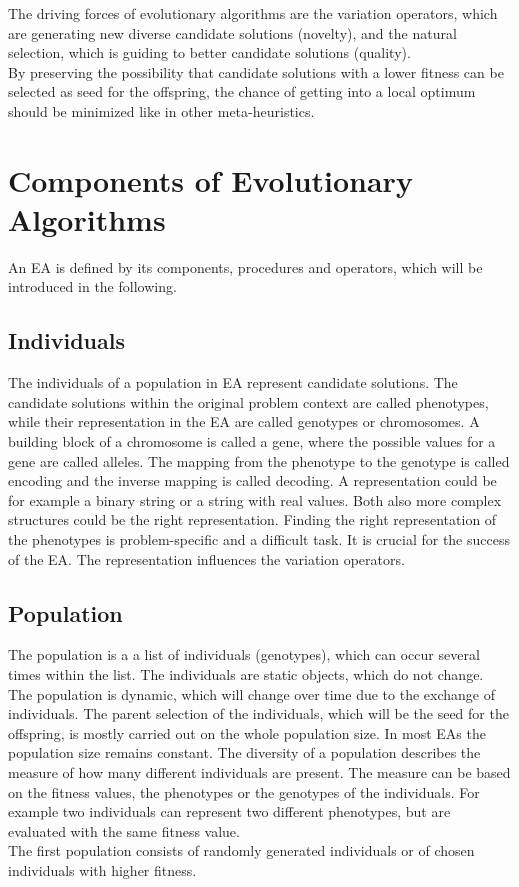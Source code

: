 The driving forces of evolutionary algorithms are the variation operators, which are generating new diverse candidate solutions (novelty), and the natural selection, which is guiding to better candidate solutions (quality)\cite{Eiben}.\\
By preserving the possibility that candidate solutions with a lower fitness can be selected as seed for the offspring, the chance of getting into a local optimum should be minimized like in other meta-heuristics.\\

    \section{Components of Evolutionary Algorithms}
    \label{sec:EAcomponents}
    An EA is defined by its components, procedures and operators, which will be introduced in the following.
        
        \subsection{Individuals}
        The individuals of a population in EA represent candidate solutions. The candidate solutions within the original problem context are called phenotypes, while their representation in the EA are called genotypes or chromosomes. A building block of a chromosome is called a gene, where the possible values for a gene are called alleles. The mapping from the phenotype to the genotype is called encoding and the inverse mapping is called decoding. A representation could be for example a binary string or a string with real values. Both also more complex structures could be the right representation. Finding the right representation of the phenotypes is problem-specific and a difficult task. It is crucial for the success of the EA. The representation influences the variation operators.
        
        \subsection{Population}
        The population is a a list of individuals (genotypes), which can occur several times within the list. The individuals are static objects, which do not change. The population is dynamic, which will change over time due to the exchange of individuals. The parent selection of the individuals, which will be the seed for the offspring, is mostly carried out on the whole population size. In most EAs the population size remains constant. The diversity of a population describes the measure of how many different individuals are present. The measure can be based on the fitness values, the phenotypes or the genotypes of the individuals. For example two individuals can represent two different phenotypes, but are evaluated with the same fitness value.\\
        The first population consists of randomly generated individuals or of chosen individuals with higher fitness.
        
